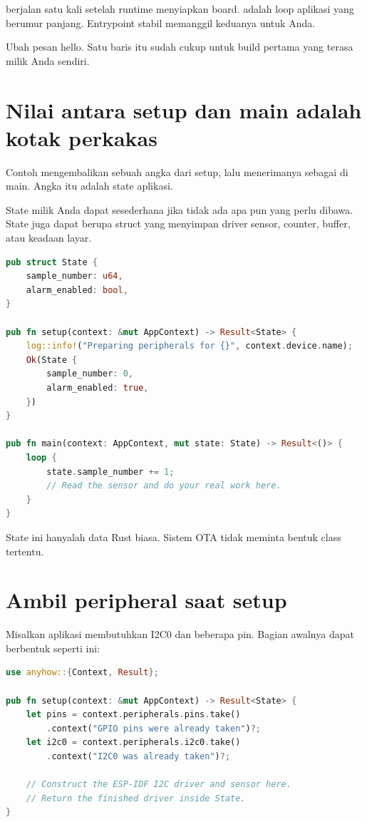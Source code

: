  berjalan satu kali setelah runtime menyiapkan board.  adalah loop aplikasi yang berumur panjang. Entrypoint stabil memanggil keduanya untuk Anda.

Ubah pesan hello. Satu baris itu sudah cukup untuk build pertama yang terasa milik Anda sendiri.

\section{Nilai antara setup dan main adalah kotak perkakas}

Contoh mengembalikan sebuah angka dari setup, lalu menerimanya sebagai  di main. Angka itu adalah state aplikasi.

State milik Anda dapat sesederhana \codepath{()} jika tidak ada apa pun yang perlu dibawa. State juga dapat berupa struct yang menyimpan driver sensor, counter, buffer, atau keadaan layar.

\begin{lstlisting}[language=Rust]
pub struct State {
    sample_number: u64,
    alarm_enabled: bool,
}

pub fn setup(context: &mut AppContext) -> Result<State> {
    log::info!("Preparing peripherals for {}", context.device.name);
    Ok(State {
        sample_number: 0,
        alarm_enabled: true,
    })
}

pub fn main(context: AppContext, mut state: State) -> Result<()> {
    loop {
        state.sample_number += 1;
        // Read the sensor and do your real work here.
    }
}
\end{lstlisting}

State ini hanyalah data Rust biasa. Sistem OTA tidak meminta bentuk class tertentu.

\section{Ambil peripheral saat setup}

Misalkan aplikasi membutuhkan I2C0 dan beberapa pin. Bagian awalnya dapat berbentuk seperti ini:

\begin{lstlisting}[language=Rust]
use anyhow::{Context, Result};

pub fn setup(context: &mut AppContext) -> Result<State> {
    let pins = context.peripherals.pins.take()
        .context("GPIO pins were already taken")?;
    let i2c0 = context.peripherals.i2c0.take()
        .context("I2C0 was already taken")?;

    // Construct the ESP-IDF I2C driver and sensor here.
    // Return the finished driver inside State.
}
\end{lstlisting}


